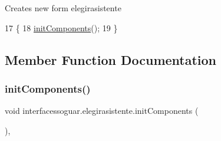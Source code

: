 Creates new form elegirasistente 
\begin{DoxyCode}
17                              \{
18         \mbox{\hyperlink{classinterfacessoguar_1_1elegirasistente_a632fafbdcfeeb8573bd6a734a12966f9}{initComponents}}();
19     \}
\end{DoxyCode}


\subsection{Member Function Documentation}
\mbox{\label{classinterfacessoguar_1_1elegirasistente_a632fafbdcfeeb8573bd6a734a12966f9}} 
\subsubsection{\texorpdfstring{init\+Components()}{initComponents()}}
{\footnotesize\ttfamily void interfacessoguar.\+elegirasistente.\+init\+Components (\begin{DoxyParamCaption}{ }\end{DoxyParamCaption})\hspace{0.3cm}{\ttfamily [inline]}, {\ttfamily [private]}}

